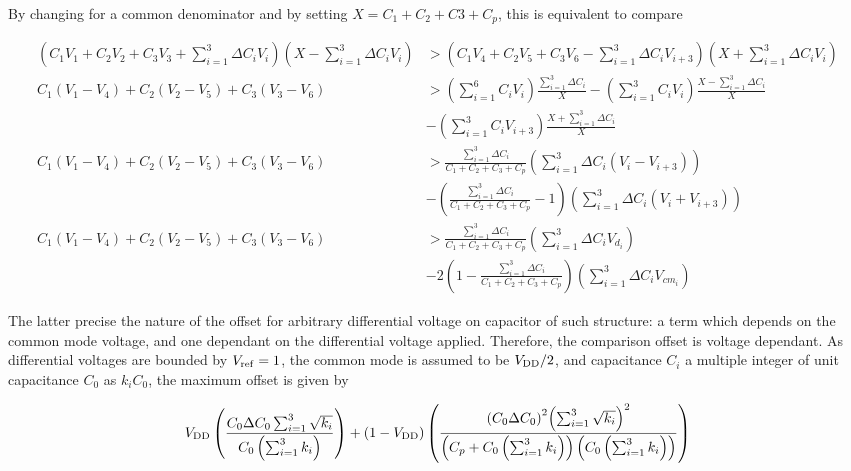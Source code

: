 By changing for a common denominator and by setting \(X = C_1 + C_2 + C3 + C_p\), this is equivalent to compare 

\begin{align}
	\left(C_1V_1+C_2V_2+C_3V_3+\sum_{i=1}^{3}{\Delta C_i V_i}\right)\left(X-\sum_{i=1}^{3}{\Delta C_i V_i}\right) &> \left(C_1V_4+C_2V_5+C_3V_6-\sum_{i=1}^{3}{\Delta C_i V_{i+3}}\right)\left(X+\sum_{i=1}^{3}{\Delta C_i V_i}\right) \\
	C_1(V_1-V_4)+C_2(V_2-V_5)+C_3(V_3-V_6) &> \left(\sum_{i=1}^{6}{C_i V_i}\right)\frac{\sum_{i=1}^{3}{\Delta C_i}}{X} - \left(\sum_{i=1}^{3}{C_i V_i}\right)\frac{X-\sum_{i=1}^{3}{\Delta C_i}}{X} \\
	&- \left(\sum_{i=1}^{3}{C_i V_{i+3}}\right)\frac{X+\sum_{i=1}^{3}{\Delta C_i}}{X} \nonumber \\
	C_1(V_1-V_4)+C_2(V_2-V_5)+C_3(V_3-V_6) &> \frac{\sum_{i=1}^{3}{\Delta C_i}}{C_1+C_2+C_3+C_p}\left(\sum_{i=1}^{3}{\Delta C_i (V_i-V_{i+3})}\right) \\ 
	&- \left(\frac{\sum_{i=1}^{3}{\Delta C_i}}{C_1+C_2+C_3+C_p}-1\right)\left(\sum_{i=1}^{3}{\Delta C_i (V_i+V_{i+3})}\right) \nonumber \\ 
	C_1(V_1-V_4)+C_2(V_2-V_5)+C_3(V_3-V_6) &> \frac{\sum_{i=1}^{3}{\Delta C_i}}{C_1+C_2+C_3+C_p}\left(\sum_{i=1}^{3}{\Delta C_i V_{d_i}}\right) \\
	&- 2\left(1-\frac{\sum_{i=1}^{3}{\Delta C_i}}{C_1+C_2+C_3+C_p}\right)\left(\sum_{i=1}^{3}{\Delta C_i V_{cm_i}}\right) \nonumber
\end{align}

The latter precise the nature of the offset for arbitrary differential voltage on capacitor of such structure: a term which depends on the common mode voltage, and one dependant on the differential voltage applied. Therefore, the comparison offset is voltage dependant. As differential voltages are bounded by \(V_{\rm ref} = 1\), the common mode is assumed to be \(V_{\rm DD}/2\), and capacitance \(C_i\) a multiple integer of unit capacitance \(C_0\) as \(k_iC_0\), the maximum offset is given by

\begin{equation}
 V_{\rm DD}\left(\frac{C_0 \Delta C_0\sum_{i=1}^{3}{\sqrt{k_i}}}{C_0\left(\sum_{i=1}^{3}{k_i}\right)}\right)+(1-V_{\rm DD})\left(\frac{{\left(C_0 \Delta C_0\right)}^2{\left(\sum_{i=1}^{3}{\sqrt{k_i}}\right)}^2}{\left(C_p+C_0\left(\sum_{i=1}^{3}{k_i}\right)\right)\left(C_0\left(\sum_{i=1}^{3}{k_i}\right)\right)} \right)
\end{equation}

